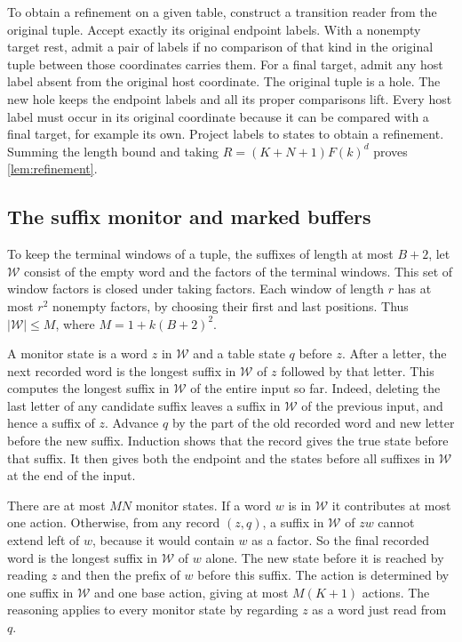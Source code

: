 To obtain a refinement on a given table, construct a transition
reader from the original tuple. Accept exactly its original
endpoint labels. With a nonempty target rest, admit a pair of labels
if no comparison of that kind in the original tuple between those
coordinates carries them. For a final target, admit any host label
absent from the original host coordinate. The original tuple is a
hole. The new hole keeps the endpoint labels and all its proper
comparisons lift. Every host label must occur in its original
coordinate because it can be compared with a final target, for
example its own. Project labels to states to obtain a refinement.
Summing the length bound and taking $R=(K+N+1)F(k)^d$ proves
\cref{lem:refinement}.

\subsection{The suffix monitor and marked buffers}
\label{app:suffix-monitor}

To keep the terminal windows of a tuple, the suffixes of length at most
$B+2$, let $\mathcal W$ consist of the empty word and the factors of the
terminal windows. This set of window factors is closed under taking
factors. Each window of length $r$ has at most $r^2$ nonempty factors,
by choosing their first and last positions. Thus $|\mathcal W|\le M$,
where $M=1+k(B+2)^2$.

A monitor state is a word $z$ in $\mathcal W$ and a table state
$q$ before $z$. After a letter, the next recorded word is the
longest suffix in $\mathcal W$ of $z$ followed by that letter. This
computes the longest suffix in $\mathcal W$ of the entire input so
far. Indeed, deleting the last letter of any candidate suffix
leaves a suffix in $\mathcal W$ of the previous input, and hence a
suffix of $z$. Advance $q$ by the part of the old recorded word
and new letter before the new suffix. Induction shows that the
record gives the true state before that suffix. It then gives
both the endpoint and the states before all suffixes in $\mathcal W$
at the end of the input.

There are at most $MN$ monitor states. If a word $w$ is in
$\mathcal W$ it contributes at most one action. Otherwise, from any
record $(z,q)$, a suffix in $\mathcal W$ of $zw$ cannot extend left of
$w$, because it would contain $w$ as a factor. So the final recorded
word is the longest suffix in $\mathcal W$ of $w$ alone. The new state
before it is reached by reading $z$ and then the prefix of $w$
before this suffix. The action is determined by one suffix in
$\mathcal W$ and one base action, giving at most $M(K+1)$ actions.
The reasoning applies to every monitor state by regarding $z$
as a word just read from $q$.


